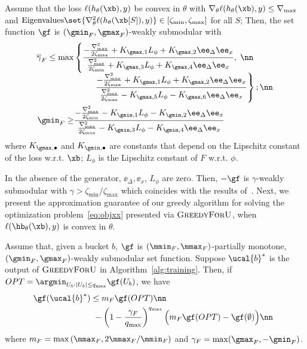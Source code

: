 \documentclass[letterpaper]{article}
\renewcommand{\cite}{\citep}
\begin{document}
\begin{theorem} Assume that the loss $\ell(h_{\theta}(\xb),y)$  be convex in $\theta$ with
$\nabla_{\theta}\ell(h_{\theta}(\xb),y) \le \nabla_{\max}$ 
and $\text{Eigenvalues}\set{\nabla^2 _{\theta} \ell(h_{\theta}(\xb[S]),y)} \in [\zeta_{\min}, \zeta_{\max}]$ for all $S$; 
Then,
\label{thm:sub}
the set function $\gf$  is $(\gmin_F,\gmax_F)$-weakly submodular 
with
\begin{align}
 \hspace{-2mm}\overline{\gamma}_F \le \max&\left\{  \frac{   -\frac{\nabla_{\max} ^2}{2\zeta_{\max}}+ K_{\gmax,1} L_\phi  + K_{\gmax,2} \ee_{\Delta} \ee_x  }{\frac{\nabla_{\max} ^2}{2\zeta_{\min}}+ K_{\gmax,3} L_\phi   + K_{\gmax,4}  \ee_{\Delta} \ee_x   }, \right. \nn\\[-1ex]
& \qquad \ \left.  \frac{    -\frac{\nabla_{\max} ^2}{2\zeta_{\max}}+ K_{\gmax,1} L_\phi  + K_{\gmax,2} \ee_{\Delta} \ee_x  }{\frac{\nabla_{\max} ^2}{2\zeta_{\max}}- K_{\gmax,5}L_\phi -K_{\gmax,6} \ee_{\Delta} \ee_x  }
 \right\}; \nn\\
 \gmin_F \ge   
& \frac{   -\frac{\nabla_{\max} ^2}{2\zeta_{\min}}- K_{\gmin,1} L_\phi - K_{\gmin,2} \ee_{\Delta} \ee_x  }{\frac{ \nabla_{\max} ^2}{2\zeta_{\max}}- K_{\gmin,3} L_\phi  -  K_{\gmin,4} \ee_{\Delta} \ee_x    }
\end{align}
where $K_{\gmax,\bullet}$ and $K_{\gmin, \bullet}$ are constants that depend on the Lipschitz constant of the loss w.r.t. $\xb$; $L_{\phi}$ is the Lipschitz constant of $F$ w.r.t. $\phi$.
\end{theorem}
In the absence of the generator, $\ee_\Delta, \ee_x$, $L_{\phi}$ are zero. Then, $-\gf$ is $\gamma$-weakly submodular with $\gamma > \zeta_{\min}/\zeta_{\max}$ which coincides with the results of~\cite{elenberg2018restricted}.
%
Next, we present the approximation guarantee of our greedy algorithm for solving the optimization problem~\eqref{eq:objxx} presented via $\textsc{GreedyForU}$, when $\ell(\hb_{\theta} (\xb),y)$ is convex in $\theta$. 
\begin{theorem} Assume that, given a bucket $b$,  $\gf$ is  $(\mmin_F,\mmax_F)$-partially monotone, $(\gmin_F,\gmax_F)$-weakly submodular set function. Suppose $\ucal{b}^*$ is
the output of $\textsc{GreedyForU}$ in Algorithm~\ref{alg:training}. Then, if $OPT=\argmin_{U_b: |U_b|\le{q_{\max}}} \gf(U_b)  $, we have 
\begin{align}
\hspace{-2mm}\gf(\ucal{b}^*) & \le   m_F \gf(OPT)\nn\\ 
& \  -\left(1-\frac{\gamma_F}{q_{\max}} \right)^{q_{\max}} \Big(m_F \gf(OPT)-\gf(\emptyset)\Big) \nn
\end{align}
where $m_F=\max\left(\mmax_F, 2\mmax_F/\mmin_F \right)$ and $\gamma_F = \max(\gmax_F,-\gmin_F)$.
\label{thm:greedy}
\vspace{-1mm}
\end{theorem}
\end{document}

